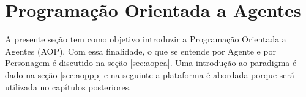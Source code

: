 \section{Programação Orientada a Agentes}

A presente seção tem como objetivo introduzir a Programação Orientada a
Agentes (AOP). Com essa finalidade,
o que se entende por Agente e por Personagem é discutido na seção
\ref{sec:aopca}. Uma introdução ao paradigma é dado na seção
\ref{sec:aoppp} e na seguinte a plataforma \jason é abordada
porque será utilizada no capítulos posteriores.





